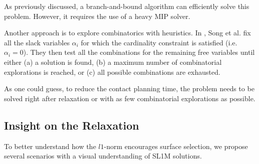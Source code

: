 As previously discussed, a branch-and-bound algorithm can efficiently solve this problem. 
However, it requires the use of a heavy MIP solver.

Another approach is to explore combinatorics with heuristics.
In \cite{sl1m_v2}, Song et al. fix all the slack variables $\alpha_i$ for which the cardinality constraint is satisfied (i.e. $\alpha_i=0$). 
They then test all the combinations for the remaining free variables until either (a) a solution is found, (b) a maximum number of combinatorial explorations is reached, or (c) all possible combinations are exhausted.

As one could guess, to reduce the contact planning time, the problem needs to be solved right after relaxation or with as few combinatorial explorations as possible.


\subsection{Insight on the Relaxation}
\label{subsub:insight_l1}
To better understand how the $l1$-norm encourages surface selection, we propose several scenarios with a visual understanding of SL1M solutions.

